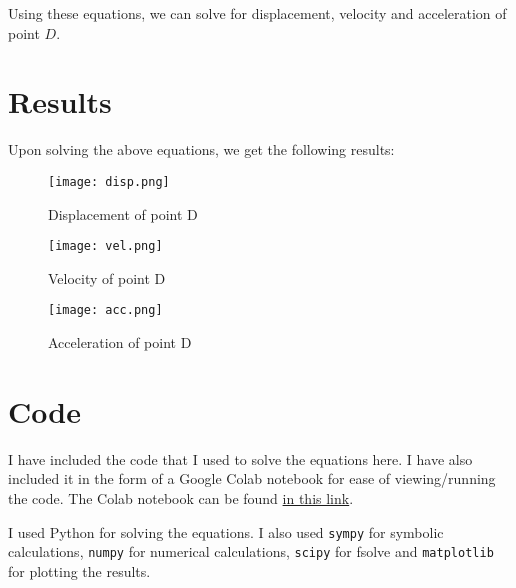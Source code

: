 \documentclass[12pt]{article}
\begin{document}
Using these equations, we can solve for displacement, velocity and acceleration of point $D$.

\section{Results}
Upon solving the above equations, we get the following results:

\begin{figure}[H]
    \centering
    \texttt{[image: disp.png]}
    \caption{Displacement of point D}
    \label{fig:disp}
\end{figure}

\begin{figure}[H]
    \centering
    \texttt{[image: vel.png]}
    \caption{Velocity of point D}
    \label{fig:vel}
\end{figure}

\begin{figure}[H]
    \centering
    \texttt{[image: acc.png]}
    \caption{Acceleration of point D}
    \label{fig:acc}
\end{figure}

\section{Code}

I have included the code that I used to solve the equations here. I have also included it in the form of a Google Colab notebook for ease of viewing/running the code. The Colab notebook can be found \href{https://colab.research.google.com/drive/1yX8z83YI7DqqWATXlR65TZzdsSwZuEFS?usp=sharing}{in this link}.

I used Python for solving the equations. I also used \texttt{sympy} for symbolic calculations, \texttt{numpy} for numerical calculations, \texttt{scipy} for fsolve and \texttt{matplotlib} for plotting the results.
\end{document}
